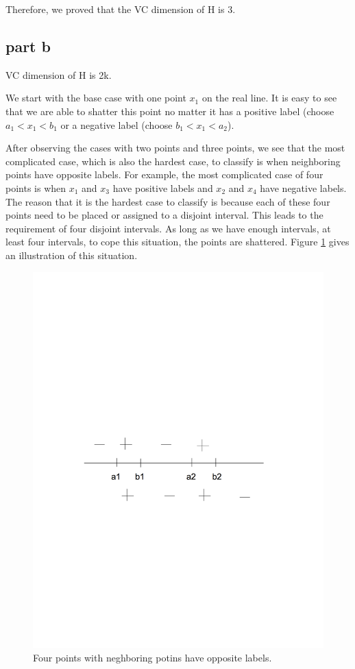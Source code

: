 Therefore, we proved that the VC dimension of H is 3.

\subsection{part b}
VC dimension of H is 2k.

We start with the base case with one point $x_1$ on the real line. It is easy to see that we are able to shatter this point no matter it has a positive label (choose $a_1<x_1<b_1$ or a negative label (choose $b_1<x_1<a_2$).

After observing the cases with two points and three points, we see that the most complicated case, which is also the hardest case, to classify is when neighboring points have opposite labels. For example, the most complicated case of four points is when $x_1$ and $x_3$ have positive labels and $x_2$ and $x_4$ have negative labels. The reason that it is the hardest case to classify is because each of these four points need to be placed or assigned to a disjoint interval. This leads to the requirement of four disjoint intervals. As long as we have enough intervals, at least four intervals, to cope this situation, the points are shattered. Figure \ref{fig:p1} gives an illustration of this situation.

\begin{figure}[!htb]
\centering
\includegraphics[trim=0 300 0 330, clip = true, scale=.5]{p1.png}
\caption{Four points with neghboring potins have opposite labels.}
\label{fig:p1}
\end{figure}

